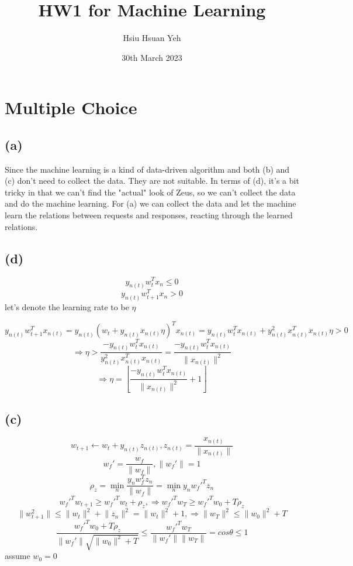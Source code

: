 \documentclass[12pt,a4paper]{article}
\title{ HW1 for Machine Learning }
\author{ Hsiu Hsuan Yeh }
\date{ 30th March 2023 }
\begin{document}
\maketitle

\section{Multiple Choice}
\subsection{(a)}
Since the machine learning is a kind of data-driven algorithm and both (b) and (c) don't need to collect the data. They are not suitable. In terms of (d), it's a bit  tricky in that we can't find the "actual" look of Zeus, so we can't collect the  data and do the machine learning. For (a) we can collect the data and let the  machine learn the relations between requests and responses, reacting through the  learned relations. 

\subsection{(d)}
\[
y_{n(t)}w_t^Tx_n \le 0
\]
\[
y_{n(t)}w_{t+1}^Tx_n > 0
\]
let's denote the learning rate to be $\eta$

\[
y_{n(t)} w_{t+1}^T x_{n(t)} = 
    y_{n(t)} (w_t + y_{n(t)} x_{n(t)} \eta)^T x_{n(t)} = 
    y_{n(t)} w_t^T x_{n(t)} + y_{n(t)}^2 x_{n(t)}^T x_{n(t)} \eta > 0
\]
\[
\Rightarrow 
    \eta > \frac{-y_{n(t)} w_t^T x_{n(t)}}{y_{n(t)}^2 x_{n(t)}^T x_{n(t)}} = 
    \frac{-y_{n(t)} w_t^T x_{n(t)}}{\lVert {x_{n(t)}} \rVert^2}
\]
\[
\Rightarrow 
    \eta = \left \lfloor 
        {\frac{-y_{n(t)} w_t^T x_{n(t)}}{\lVert {x_{n(t)}} \rVert ^ 2} + 1} 
    \right \rfloor
\]
\subsection{(c)}
\[
w_{t+1} \leftarrow w_t + y_{n(t)} z_{n(t)},
z_{n(t)} = \frac{x_{n(t)}}{\lVert {x_{n(t)}} \rVert}
\]
\[
w_f' = \frac{w_f}{\lVert w_f \rVert}, 
\lVert w_f' \rVert = 1
\]
\[
\rho_z = 
    \min_{n} \frac{y_nw_f^Tz_n}{\lVert w_f \rVert} = 
    \min_{n} y_nw_f'^Tz_n
\]
\[
w_f'^Tw_{t+1} \ge 
    w_f'^Tw_t + \rho_z, 
\Rightarrow w_f'^Tw_T \ge w_f'^Tw_0 + T\rho_z
\]
\[
\lVert w_{t+1}^2 \rVert \le 
    \lVert w_t \rVert^2 + \lVert z_n \rVert^2 = 
    \lVert w_t \rVert^2 + 1, 
\Rightarrow \lVert w_T \rVert^2 \le \lVert w_0 \rVert^2 + T
\]
\[
\frac{w_f'^Tw_0 + T\rho_z}{\lVert w_f' \rVert \sqrt{\lVert w_0 \rVert^2 + T}} \le 
    \frac{w_f'^Tw_T}{\lVert w_f' \rVert \lVert w_T \rVert} = 
    cos\theta \le 1
\]
assume $w_0=0$
\end{document}
